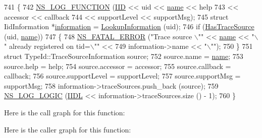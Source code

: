 \begin{DoxyCode}
741 \{
742   \hyperlink{log-macros-disabled_8h_a90b90d5bad1f39cb1b64923ea94c0761}{NS\_LOG\_FUNCTION} (\hyperlink{type-id_8cc_a88c5717498eac8c8d6a06538e6c65d49}{IID} << uid << \hyperlink{generate__test__data__lte__spectrum__model_8m_ab74e6bf80237ddc4109968cedc58c151}{name} << help
743                    << accessor << callback
744                    << supportLevel << supportMsg);
745   \textcolor{keyword}{struct }IidInformation *\hyperlink{doc_2readme_8txt_a56b8f954d58753a81bcf37ef0ad7ca0a}{information}  = \hyperlink{classns3_1_1IidManager_a6b1f4ba2815dba27a377e8a8db2384cf}{LookupInformation} (uid);
746   \textcolor{keywordflow}{if} (\hyperlink{classns3_1_1IidManager_a485d3d45a86d50e35c464672db397734}{HasTraceSource} (uid, \hyperlink{generate__test__data__lte__spectrum__model_8m_ab74e6bf80237ddc4109968cedc58c151}{name}))
747     \{
748       \hyperlink{group__fatal_ga5131d5e3f75d7d4cbfd706ac456fdc85}{NS\_FATAL\_ERROR} (\textcolor{stringliteral}{"Trace source \(\backslash\)""} << \hyperlink{generate__test__data__lte__spectrum__model_8m_ab74e6bf80237ddc4109968cedc58c151}{name} << \textcolor{stringliteral}{"\(\backslash\)" already registered on tid=\(\backslash\)""} << 
749                       information->name << \textcolor{stringliteral}{"\(\backslash\)""});
750     \}
751   \textcolor{keyword}{struct }TypeId::TraceSourceInformation source;
752   source.name = \hyperlink{generate__test__data__lte__spectrum__model_8m_ab74e6bf80237ddc4109968cedc58c151}{name};
753   source.help = help;
754   source.accessor = accessor;
755   source.callback = callback;
756   source.supportLevel = supportLevel;
757   source.supportMsg = supportMsg;
758   information->traceSources.push\_back (source);
759   \hyperlink{group__logging_ga88acd260151caf2db9c0fc84997f45ce}{NS\_LOG\_LOGIC} (\hyperlink{type-id_8cc_a3d266412e7a8a083ee1636faffe4ca8c}{IIDL} << information->traceSources.size () - 1);
760 \}
\end{DoxyCode}


Here is the call graph for this function\+:




Here is the caller graph for this function\+:


